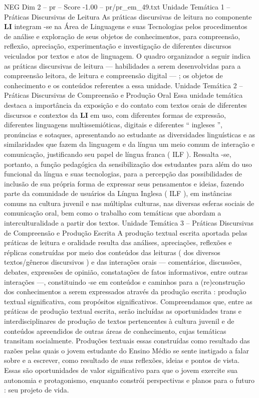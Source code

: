 \begin{textsample}{NEG Dim 2 – pr – Score -1.00 – pr/pr\_em\_49.txt}  \label{ex:f2_neg_176}
Unidade Temática 1 – Práticas Discursivas de Leitura As práticas discursivas de leitura no componente \textbf{LI} integram -se na Área de Linguagens e suas Tecnologias pelos procedimentos de análise e exploração de seus objetos de conhecimentos, para compreensão, reflexão, apreciação, experimentação e investigação de diferentes discursos veiculados por textos e atos de linguagem.
O quadro organizador a seguir indica as práticas discursivas de leitura — habilidades a serem desenvolvidas para a compreensão leitora, de leitura e compreensão digital — ; os objetos de conhecimento e os conteúdos referentes a essa unidade.
Unidade Temática 2 – Práticas Discursivas de Compreensão e Produção Oral Essa unidade temática destaca a importância da exposição e do contato com textos orais de diferentes discursos e contextos da \textbf{LI} em uso, com diferentes formas de expressão, diferentes linguagens multissemióticas, digitais e diferentes “ ingleses ”, pronúncias e sotaques, apresentando ao estudante as diversidades linguísticas e as similaridades que fazem da linguagem e da língua um meio comum de interação e comunicação, justificando seu papel de língua franca ( ILF ).
Ressalta -se, portanto, a função pedagógica da sensibilização dos estudantes para além do uso funcional da língua e suas tecnologias, para a percepção das possibilidades de inclusão de sua própria forma de expressar seus pensamentos e ideias, fazendo parte da comunidade de usuários da Língua Inglesa ( ILF ), em instâncias comuns na cultura juvenil e nas múltiplas culturas, nas diversas esferas sociais de comunicação oral, bem como o trabalho com temáticas que abordam a interculturalidade a partir dos textos.
Unidade Temática 3 – Práticas Discursivas de Compreensão e Produção Escrita A produção textual escrita aportada pelas práticas de leitura e oralidade resulta das análises, apreciações, reflexões e réplicas construídas por meio dos conteúdos das leituras ( dos diversos textos/gêneros discursivos ) e das interações orais — comentários, discussões, debates, expressões de opinião, constatações de fatos informativos, entre outras interações —, constituindo -se em conteúdos e caminhos para a (re)construção dos conhecimentos a serem expressados através da produção escrita : produção textual significativa, com propósitos significativos.
Compreendamos que, entre as práticas de produção textual escrita, serão incluídas as oportunidades trans e interdisciplinares de produção de textos pertencentes à cultura juvenil e de conteúdos apreendidos de outras áreas de conhecimento, cujas temáticas transitam socialmente.
Produções textuais essas construídas como resultado das razões pelas quais o jovem estudante do Ensino Médio se sente instigado a falar sobre e a escrever, como resultado de suas reflexões, ideias e pontos de vista.
Essas são oportunidades de valor significativo para que o jovem exercite sua autonomia e protagonismo, enquanto constrói perspectivas e planos para o futuro : seu projeto de vida.

\end{textsample}

